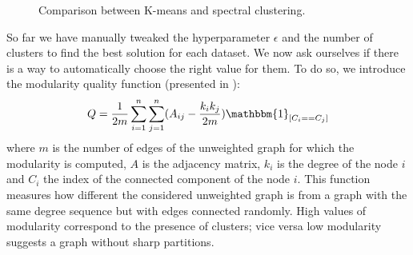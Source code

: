\documentclass{article}
\begin{document}
\begin{figure}[ht]
    \hfill
    \hfill
    \hfill
    \hfill
    \caption{Comparison between K-means and spectral clustering.}%
    \label{figure:comparison}%
\end{figure}

So far we have manually tweaked the hyperparameter $\epsilon$ and the number of clusters to find the best solution for each dataset.
We now ask ourselves if there is a way to automatically choose the right value for them.
To do so, we introduce the modularity quality function (presented in \cite{fortunato2010community}):
\begin{equation*}
    Q = \frac{1}{2m} \sum_{i=1}^n \sum_{j=1}^n (A_{ij} - \frac{k_i k_j}{2m}) \mathbbm{1}_{[C_i == C_j]}
\end{equation*}
where $m$ is the number of edges of the unweighted graph for which the modularity is computed,
$A$ is the adjacency matrix,
$k_i$ is the degree of the node $i$
and $C_i$ the index of the connected component of the node $i$.
This function measures how different the considered unweighted graph is from a graph with the same degree sequence but with
edges connected randomly.  High values of modularity correspond to the presence of clusters;
vice versa low modularity suggests a graph without sharp partitions.
\end{document}
